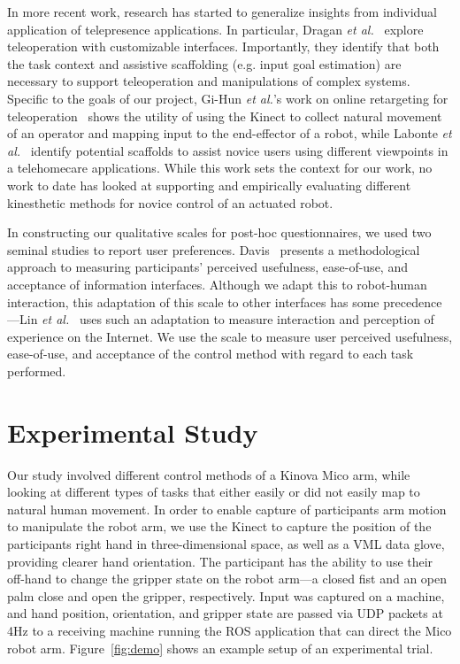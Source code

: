 \documentclass{sigchi}
\begin{document}
In more recent work, research has started to generalize insights from individual application of telepresence applications.  In particular, Dragan \emph{et al.}~\cite{dragan2013teleoperation} explore teleoperation with customizable interfaces.  Importantly, they identify that both the task context and assistive scaffolding (e.g. input goal estimation) are necessary to support teleoperation and manipulations of complex systems. Specific to the goals of our project, Gi-Hun \emph{et al.}'s work on online retargeting for teleoperation~\cite{yang2013online} shows the utility of using the Kinect to collect natural movement of an operator and mapping input to the end-effector of a robot, while Labonte \emph{et al.}~\cite{labonte2010comparative} identify potential scaffolds to assist novice users using different viewpoints in a telehomecare applications.  While this work sets the context for our work, no work to date has looked at supporting and empirically evaluating different kinesthetic methods for novice control of an actuated robot.

In constructing our qualitative scales for post-hoc questionnaires, we used two seminal studies to report user preferences.  Davis~\cite{Davis1989} presents a methodological approach to measuring participants' perceived usefulness, ease-of-use, and acceptance of information interfaces. Although we adapt this to robot-human interaction, this adaptation of this scale to other interfaces has some precedence---Lin \emph{et al.}~\cite{Lin2008} uses such an adaptation to measure interaction and perception of experience on the Internet.  We use the scale to measure user perceived usefulness, ease-of-use, and acceptance of the control method with regard to each task performed.

\section{Experimental Study}

Our study involved different control methods of a Kinova Mico arm, while looking at different types of tasks that either easily or did not easily map to natural human movement.  In order to enable capture of participants arm motion to manipulate the robot arm, we use the Kinect to capture the position of the participants right hand in three-dimensional space, as well as a VML data glove, providing clearer hand orientation.  The participant has the ability to use their off-hand to change the gripper state on the robot arm---a closed fist and an open palm close and open the gripper, respectively.  Input was captured on a machine, and hand position, orientation, and gripper state are passed via UDP packets at 4Hz to a receiving machine running the ROS application that can direct the Mico robot arm. Figure~\ref{fig:demo} shows an example setup of an experimental trial. 
\end{document}

